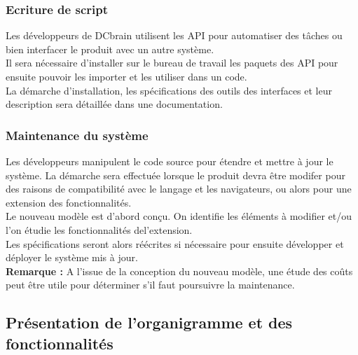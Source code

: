			\subsubsection{Ecriture de script}
				Les développeurs de DCbrain utilisent les API pour automatiser des tâches ou bien interfacer le produit avec un autre système.\\
				Il sera nécessaire d'installer sur le bureau de travail les paquets des API pour ensuite pouvoir les importer et les utiliser dans un code.\\
				La démarche d'installation, les spécifications des outils des interfaces et leur description sera détaillée dans une documentation.
				
			\subsubsection{Maintenance du système}
				Les développeurs manipulent le code source pour étendre et mettre à jour le système. La démarche sera effectuée lorsque le produit devra être modifer pour des raisons de compatibilité avec le langage et les navigateurs, ou alors pour une extension des fonctionnalités.\\
				Le nouveau modèle est d'abord conçu. On identifie les éléments à modifier et/ou l'on étudie les fonctionnalités del'extension.\\
				Les spécifications seront alors réécrites si nécessaire pour ensuite développer et déployer le système mis à jour.\\
				\textbf{Remarque :} A l'issue de la conception du nouveau modèle, une étude des coûts peut être utile pour déterminer s'il faut poursuivre la maintenance.
				
		\subsection{Présentation de l'organigramme et des fonctionnalités}
		
